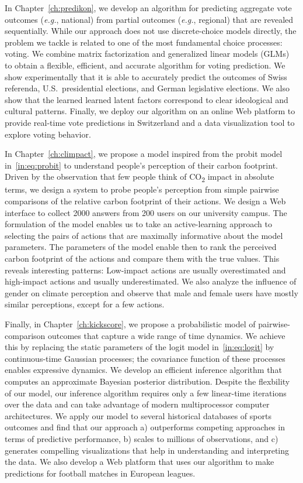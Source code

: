 In Chapter~\ref{ch:predikon}, we develop an algorithm for predicting aggregate vote outcomes (\textit{e.g.}, national) from partial outcomes (\textit{e.g.}, regional) that are revealed sequentially.
While our approach does not use discrete-choice models directly, the problem we tackle is related to one of the most fundamental choice processes: voting.
We combine matrix factorization and generalized linear models (GLMs) to obtain a flexible, efficient, and accurate algorithm for voting prediction.
We show experimentally that it is able to accurately predict the outcomes of Swiss referenda, U.S.\ presidential elections, and German legislative elections.
We also show that the learned learned latent factors correspond to clear ideological and cultural patterns.
Finally, we deploy our algorithm on an online Web platform to provide real-time vote predictions in Switzerland and a data visualization tool to explore voting behavior.

In Chapter~\ref{ch:climpact}, we propose a model inspired from the probit model in~\eqref{in:eq:probit} to understand people's perception of their carbon footprint.
Driven by the observation that few people think of CO\textsubscript{2} impact in absolute terms, we design a system to probe people's perception from simple pairwise comparisons of the relative carbon footprint of their actions.
We design a Web interface to collect 2000 answers from 200 users on our university campus.
The formulation of the model enables us to take an active-learning approach to selecting the pairs of actions that are maximally informative about the model parameters.
The parameters of the model enable then to rank the perceived carbon footprint of the actions and compare them with the true values.
This reveals interesting patterns:
Low-impact actions are usually overestimated and high-impact actions and usually underestimated.
We also analyze the influence of gender on climate perception and observe that male and female users have mostly similar perceptions, except for a few actions.

Finally, in Chapter~\ref{ch:kickscore}, we propose a probabilistic model of pairwise-comparison outcomes that capture a wide range of time dynamics.
We achieve this by replacing the static parameters of the logit model in~\eqref{in:eq:logit} by continuous-time Gaussian processes; the covariance function of these processes enables expressive dynamics.
We develop an efficient inference algorithm that computes an approximate Bayesian posterior distribution.
Despite the flexbility of our model, our inference algorithm requires only a few linear-time iterations over the data and can take advantage of modern multiprocessor computer architectures.
We apply our model to several historical databases of sports outcomes and find that our approach a) outperforms competing approaches in terms of predictive performance, b) scales to millions of observations, and c) generates compelling visualizations that help in understanding and interpreting the data.
We also develop a Web platform that uses our algorithm to make predictions for football matches in European leagues.
